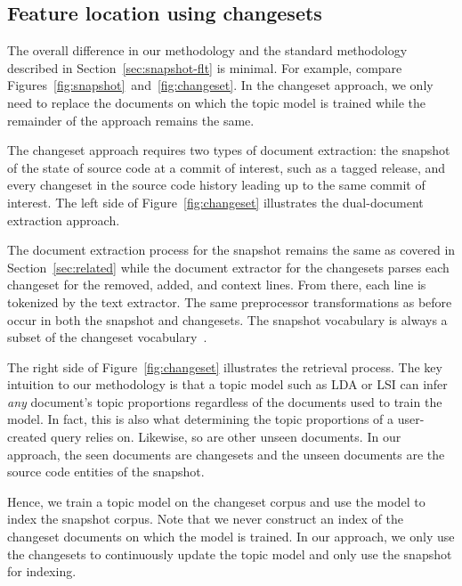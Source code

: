\subsection{Feature location using changesets}

The overall difference in our methodology and the standard methodology described in Section~\ref{sec:snapshot-flt} is minimal.
For example, compare Figures~\ref{fig:snapshot}~and~\ref{fig:changeset}.
In the changeset approach, we only need to replace the documents on which the topic model is trained
while the remainder of the approach remains the same.


The changeset approach requires two types of document extraction:
the snapshot of the state of source code at a commit of interest, such as
a tagged release, and every changeset in the source code history leading up to
the same commit of interest.  The left side of Figure~\ref{fig:changeset}
illustrates the dual-document extraction approach.

The document extraction process for the snapshot remains the same as covered in
Section~\ref{sec:related} while the document extractor for the changesets parses
each changeset for the removed, added, and context lines.  From there, each line
is tokenized by the text extractor.  The same preprocessor transformations as
before occur in both the snapshot and changesets.  The snapshot vocabulary is
always a subset of the changeset vocabulary~\cite{Corley-etal:2014}.

The right side of Figure~\ref{fig:changeset} illustrates the retrieval process.
The key intuition to our methodology is that a topic model such as LDA or LSI can
infer \emph{any} document's topic proportions regardless of the documents used
to train the model.  In fact, this is also what determining the topic
proportions of a user-created query relies on. Likewise, so are other unseen
documents. In our approach, the seen documents are changesets and the unseen
documents are the source code entities of the snapshot.

Hence, we train a topic model on the changeset corpus and use the model to index
the snapshot corpus.  Note that we never construct an index of the changeset
documents on which the model is trained.  In our approach, we only use the
changesets to continuously update the topic model and only use the snapshot for
indexing.

